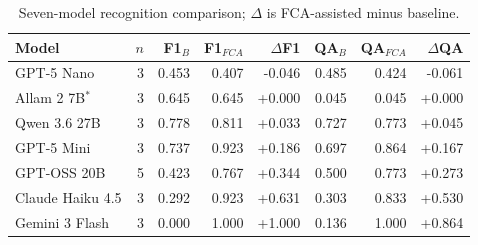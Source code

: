 \begin{table}[tbp]
\centering
\caption{Seven-model recognition comparison; $\Delta$ is FCA-assisted minus baseline.}
\label{tab:metrics}
\scriptsize
\begin{tabular}{lrrrrrrr}
\toprule
Model & $n$ & F1$_{B}$ & F1$_{FCA}$ & $\Delta$F1 & QA$_B$ & QA$_{FCA}$ & $\Delta$QA\\
\midrule
GPT-5 Nano & 3 & 0.453 & 0.407 & -0.046 & 0.485 & 0.424 & -0.061\\
Allam 2 7B$^{*}$ & 3 & 0.645 & 0.645 & +0.000 & 0.045 & 0.045 & +0.000\\
Qwen 3.6 27B & 3 & 0.778 & 0.811 & +0.033 & 0.727 & 0.773 & +0.045\\
GPT-5 Mini & 3 & 0.737 & 0.923 & +0.186 & 0.697 & 0.864 & +0.167\\
GPT-OSS 20B & 5 & 0.423 & 0.767 & +0.344 & 0.500 & 0.773 & +0.273\\
Claude Haiku 4.5 & 3 & 0.292 & 0.923 & +0.631 & 0.303 & 0.833 & +0.530\\
Gemini 3 Flash & 3 & 0.000 & 1.000 & +1.000 & 0.136 & 1.000 & +0.864\\
\bottomrule
\end{tabular}
\end{table}
